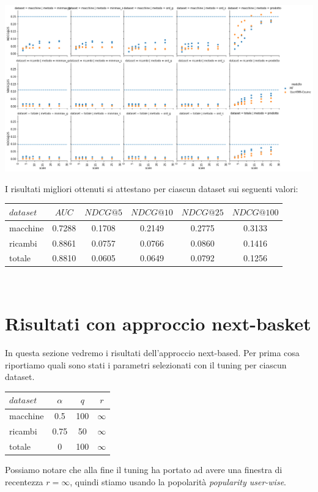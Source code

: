 \includegraphics[width=16cm]{figures/comb_2.png}

I risultati migliori ottenuti si attestano per ciascun dataset sui seguenti valori:\\

\begin{tabular}{|l|ccccc|}
    \toprule
    $dataset$  & $AUC$ & $NDCG@5$ & $NDCG@10$  & $NDCG@25$ & $NDCG@100$  \\
    \midrule
    macchine & 0.7288 & 0.1708 & 0.2149 & 0.2775 & 0.3133 \\
    ricambi & 0.8861  & 0.0757 & 0.0766 & 0.0860 & 0.1416 \\
    totale  & 0.8810  & 0.0605 & 0.0649 & 0.0792 & 0.1256 \\
\bottomrule
\end{tabular}\\

\section{Risultati con approccio next-basket}
In questa sezione vedremo i risultati dell'approccio next-based. Per prima cosa riportiamo quali sono stati i parametri selezionati con il tuning per ciascun dataset.\\

\begin{minipage}[H]{0.45\textwidth}
    \begin{tabular}{|l|ccc|}
        \toprule
        $dataset$ &    $\alpha$ &  $q$ & $r$ \\
        \midrule
        macchine & 0.5 & 100 & $\infty$ \\
        ricambi  &	0.75 & 50 & $\infty$ \\
        totale  & 0 & 100 & $\infty$ \\
    \bottomrule
    \end{tabular}
\end{minipage}
\begin{minipage}[H]{0.55\textwidth}
    Possiamo notare che alla fine il tuning ha portato ad avere una finestra di recentezza  $r = \infty$, quindi stiamo usando la popolarità \textit{popularity user-wise}. 
\end{minipage}\\

